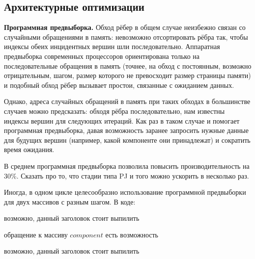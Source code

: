 \documentclass[a4paper,10pt]{extarticle}
\begin{document}

\subsection{Архитектурные оптимизации}
\label{subsec:optArch}

\textbf{Программная предвыборка.}
Обход рёбер в общем случае неизбежно связан со случайными обращениями в память: невозможно отсортировать рёбра так, чтобы индексы обеих инцидентных вершин шли последовательно.
Аппаратная предвыборка современных процессоров ориентирована только на последовательные обращения в память (точнее, на обход с постоянным, возможно отрицательным, шагом, размер которого не превосходит размер страницы памяти) и подобный обход рёбер вызывает простои, связанные с ожиданием данных.

Однако, адреса случайных обращений в память при таких обходах в большинстве случаев можно предсказать: обходя рёбра последовательно, нам известны индексы вершин для следующих итераций. Как раз в таком случае и помогает программная предвыборка, давая возможность заранее запросить нужные данные для будущих вершин (например, какой компоненте они принадлежат) и сократить время ожидания.


В среднем программная предвыборка позволила повысить производительность на 30\%. Сказать про то, что стадии типа PJ и того можно ускорить в несколько раз.

Иногда, в одном цикле целесообразно использование программной предвыборки для двух массивов с разным шагом. В коде:
\begin{algorithm}
    \SetAlgoLined
    \caption{возможно, данный заголовок стоит выпилить}
\end{algorithm}

обращение к массиву $component$ есть возможность 

\begin{algorithm}[H]
    \SetAlgoLined
    \caption{возможно, данный заголовок стоит выпилить}
\end{algorithm}
\end{document}
